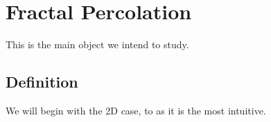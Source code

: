 \section{Fractal Percolation}
This is the main object we intend to study.

\subsection{Definition}
We will begin with the 2D case, to as it is the most intuitive.